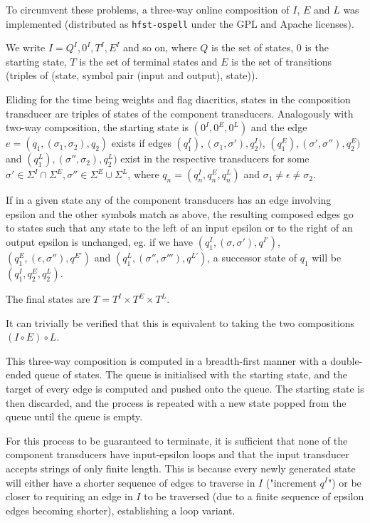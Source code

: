 \documentclass{llncs}
\begin{document}
To circumvent these problems, a three-way online composition of $I$, $E$ and
$L$ was implemented (distributed as \verb!hfst-ospell!
under the GPL and Apache licenses).

We write $I = {Q^I, 0^I, T^I, E^I}$ and so on, where $Q$
is the set of states, $0$ is the starting state, $T$ is the set of terminal
states and $E$ is the set of transitions (triples of (state, symbol pair
(input and output), state)).

Eliding for the time being weights and flag diacritics, states in the
composition transducer are triples of states of the component transducers.
Analogously with two-way composition, the starting state is $(0^I, 0^E, 0^L)$
and the edge $e = (q_1, (\sigma_1, \sigma_2), q_2)$ exists if edges
$(q^I_1), (\sigma_1, \sigma'), q^I_2)$,
$(q^E_1), (\sigma', \sigma''), q^E_2)$ and
$(q^L_1), (\sigma'', \sigma_2), q^L_2)$ exist in the respective transducers
for some
$\sigma' \in \Sigma^I \cap \Sigma^E, \sigma'' \in \Sigma^E \cup \Sigma^L$,
where $q_n = (q^I_n, q^E_n, q^L_n)$ and $\sigma_1 \neq \epsilon \neq \sigma_2$.

If in a given state any of the component transducers has an edge involving
epsilon and the other symbols match as above, the resulting composed edges
go to states such that any state to the left of an input epsilon or to the
right of an output epsilon is unchanged, eg. if we have
$(q^I_1, (\sigma, \sigma'), q^{I'})$, $(q^E_1, (\epsilon, \sigma''), q^{E'})$ and
$(q^L_1, (\sigma'', \sigma'''), q^{L'})$, a successor state of $q_1$ will be
$(q^I_1, q^E_2, q^L_2)$.

The final states are $T = T^I \times T^E \times T^L$.

It can trivially be verified that this is equivalent to taking the two
compositions $(I \circ E) \circ L$.

This three-way composition is computed in a breadth-first manner with a
double-ended queue of states. The queue is initialised with the starting state,
and the target of every edge is computed and pushed onto the
queue. The starting state is then discarded, and the process is repeated
with a new state popped from the queue until the queue is empty.

For this process to be guaranteed to terminate, it is sufficient that none of
the component transducers have input-epsilon loops and that the input
transducer accepts strings of only finite length. This is because every newly
generated state will either have a shorter sequence of edges to traverse in
$I$ ("increment $q^I$") or be closer to requiring an edge in $I$ to be traversed
(due to a finite sequence of epsilon edges becoming shorter), establishing a
loop variant.
\end{document}
